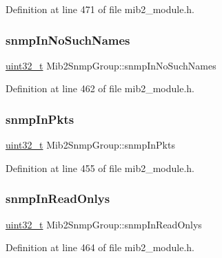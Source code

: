 Definition at line 471 of file mib2\+\_\+module.\+h.

\mbox{\label{structMib2SnmpGroup_afae20bdf06be1f37b0899fec2b8fd764}} 
\subsubsection{\texorpdfstring{snmp\+In\+No\+Such\+Names}{snmpInNoSuchNames}}
{\footnotesize\ttfamily \hyperlink{stdint_8h_a435d1572bf3f880d55459d9805097f62}{uint32\+\_\+t} Mib2\+Snmp\+Group\+::snmp\+In\+No\+Such\+Names}



Definition at line 462 of file mib2\+\_\+module.\+h.

\mbox{\label{structMib2SnmpGroup_a26570c171babeb840b0a6c550f8ac96a}} 
\subsubsection{\texorpdfstring{snmp\+In\+Pkts}{snmpInPkts}}
{\footnotesize\ttfamily \hyperlink{stdint_8h_a435d1572bf3f880d55459d9805097f62}{uint32\+\_\+t} Mib2\+Snmp\+Group\+::snmp\+In\+Pkts}



Definition at line 455 of file mib2\+\_\+module.\+h.

\mbox{\label{structMib2SnmpGroup_a2a26381c50a39bfd9e427010301c5b3e}} 
\subsubsection{\texorpdfstring{snmp\+In\+Read\+Onlys}{snmpInReadOnlys}}
{\footnotesize\ttfamily \hyperlink{stdint_8h_a435d1572bf3f880d55459d9805097f62}{uint32\+\_\+t} Mib2\+Snmp\+Group\+::snmp\+In\+Read\+Onlys}



Definition at line 464 of file mib2\+\_\+module.\+h.

